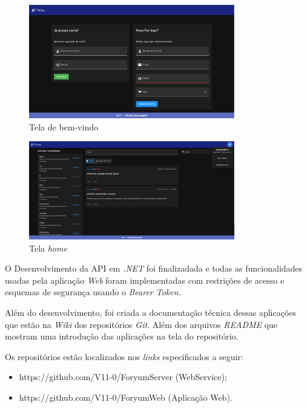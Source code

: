 \documentclass[12pt]{article}
\begin{document}
\begin{figure}[h]
    \centering
    \includegraphics[width=0.8\textwidth]{prints/welcome.png}
    \caption{Tela de bem-vindo}\label{fig:welcome}
\end{figure}

\begin{figure}[h]
    \centering
    \includegraphics[width=0.8\textwidth]{prints/home.png}
    \caption{Tela \textit{home}}\label{fig:home}
\end{figure}

O Desenvolvimento da API em \textit{.NET} foi finalizadada e todas as funcionalidades
usadas pela aplicação \textit{Web} foram implementadas com restrições de acesso e esquemas de
segurança usando o \textit{Bearer Token}.

Além do desenvolvimento, foi criada a documentação técnica dessas aplicações que estão
na \textit{Wiki} dos repositórios \textit{Git}. Além dos arquivos \textit{README} que mostram
uma introdução das aplicações na tela do repositório.

Os repositórios estão localizados nos \textit{links} especificados a seguir:
\begin{itemize}
  \item https://github.com/V11-0/ForyumServer (WebService);
  \item https://github.com/V11-0/ForyumWeb (Aplicação Web).
\end{itemize}
\end{document}
